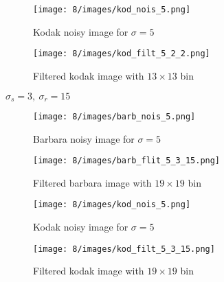 \documentclass[12pt]{article}
\begin{document}
\begin{itemize}
    \begin{figure}[H]
        \centering
        \begin{minipage}{.45\textwidth}
          \centering
          \texttt{[image: 8/images/kod\_nois\_5.png]}
          \caption*{Kodak noisy image for $\sigma = 5$}
          \label{fig:totalpowervst}
        \end{minipage}
        \begin{minipage}{.45\textwidth}
          \centering
          \texttt{[image: 8/images/kod\_filt\_5\_2\_2.png]}
          \caption*{Filtered kodak image with $13\times 13$ bin}
          \label{fig:totalpower2}
        \end{minipage}
        \label{fig:totalPower}
    \end{figure}
    
    $\sigma_s = 3, \ \sigma_r = 15$
    \begin{figure}[H]
        \centering
        \begin{minipage}{.45\textwidth}
          \centering
          \texttt{[image: 8/images/barb\_nois\_5.png]}
          \caption*{Barbara noisy image for $\sigma = 5$}
          \label{fig:totalpowervst}
        \end{minipage}
        \begin{minipage}{.45\textwidth}
          \centering
          \texttt{[image: 8/images/barb\_flit\_5\_3\_15.png]}
          \caption*{Filtered barbara image with $19\times 19$ bin}
          \label{fig:totalpower2}
        \end{minipage}
        \label{fig:totalPower}
    \end{figure}
    
    \begin{figure}[H]
        \centering
        \begin{minipage}{.45\textwidth}
          \centering
          \texttt{[image: 8/images/kod\_nois\_5.png]}
          \caption*{Kodak noisy image for $\sigma = 5$}
          \label{fig:totalpowervst}
        \end{minipage}
        \begin{minipage}{.45\textwidth}
          \centering
          \texttt{[image: 8/images/kod\_filt\_5\_3\_15.png]}
          \caption*{Filtered kodak image with $19\times 19$ bin}
          \label{fig:totalpower2}
        \end{minipage}
        \label{fig:totalPower}
    \end{figure}
    

\end{itemize}
\end{document}
